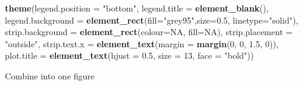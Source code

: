 \documentclass[
]{article}
\newenvironment{Shaded}{\begin{snugshade}}{\end{snugshade}}
\newcommand{\DataTypeTok}[1]{\textcolor[rgb]{0.13,0.29,0.53}{#1}}
\newcommand{\DecValTok}[1]{\textcolor[rgb]{0.00,0.00,0.81}{#1}}
\newcommand{\FloatTok}[1]{\textcolor[rgb]{0.00,0.00,0.81}{#1}}
\newcommand{\KeywordTok}[1]{\textcolor[rgb]{0.13,0.29,0.53}{\textbf{#1}}}
\newcommand{\NormalTok}[1]{#1}
\newcommand{\OtherTok}[1]{\textcolor[rgb]{0.56,0.35,0.01}{#1}}
\newcommand{\StringTok}[1]{\textcolor[rgb]{0.31,0.60,0.02}{#1}}
\begin{document}
\begin{Shaded}
\begin{Highlighting}[]
\StringTok{  }\KeywordTok{theme}\NormalTok{(}\DataTypeTok{legend.position =} \StringTok{"bottom"}\NormalTok{, }\DataTypeTok{legend.title =} \KeywordTok{element\_blank}\NormalTok{(), }\DataTypeTok{legend.background =} \KeywordTok{element\_rect}\NormalTok{(}\DataTypeTok{fill=}\StringTok{"grey95"}\NormalTok{,}\DataTypeTok{size=}\FloatTok{0.5}\NormalTok{, }\DataTypeTok{linetype=}\StringTok{"solid"}\NormalTok{), }\DataTypeTok{strip.background =} \KeywordTok{element\_rect}\NormalTok{(}\DataTypeTok{colour=}\OtherTok{NA}\NormalTok{, }\DataTypeTok{fill=}\OtherTok{NA}\NormalTok{), }\DataTypeTok{strip.placement =} \StringTok{"outside"}\NormalTok{, }\DataTypeTok{strip.text.x =} \KeywordTok{element\_text}\NormalTok{(}\DataTypeTok{margin =} \KeywordTok{margin}\NormalTok{(}\DecValTok{0}\NormalTok{, }\DecValTok{0}\NormalTok{, }\FloatTok{1.5}\NormalTok{, }\DecValTok{0}\NormalTok{)), }\DataTypeTok{plot.title =} \KeywordTok{element\_text}\NormalTok{(}\DataTypeTok{hjust =} \FloatTok{0.5}\NormalTok{, }\DataTypeTok{size =} \DecValTok{13}\NormalTok{, }\DataTypeTok{face =} \StringTok{"bold"}\NormalTok{)) }
\end{Highlighting}
\end{Shaded}

Combine into one figure
\end{document}
